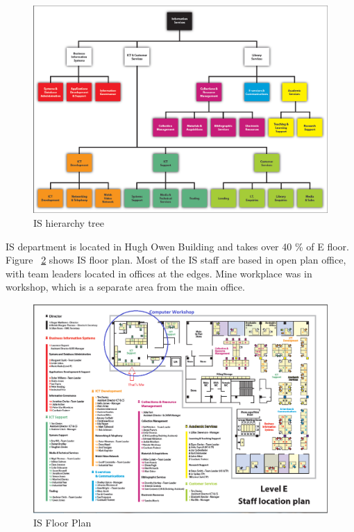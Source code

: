 \documentclass[10pt,a4paper,headinclude=true]{report}
\begin{document}
\begin{figure}[H]
\centering
\centerline{\includegraphics[scale=0.55]{./i-s-hierarchy-tree-march-2012}}
\caption{IS hierarchy tree}
\label{fig:i-s-hierarchy-tree-march-2012}
\end{figure}

IS department is located in Hugh Owen Building and takes over 40 \% of E floor.  Figure ~\ref{fig:isfloorplan} shows IS floor plan. Most of the IS staff are based in open plan office, with team leaders located in offices at the edges. Mine workplace was in workshop, which is a separate area from the main office.

\begin{figure}[H]
\centering
\centerline{\includegraphics[scale=0.55]{./isfloorplan}}
\caption{IS Floor Plan \cite{ISFloor}}
\label{fig:isfloorplan}
\end{figure}
\end{document}
